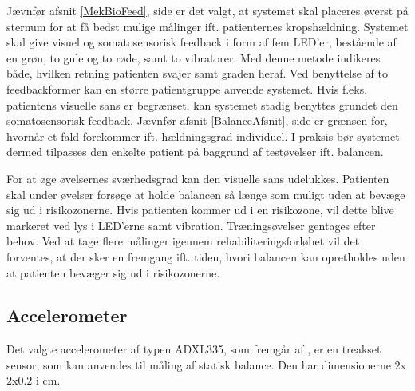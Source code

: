 Jævnfør afsnit \ref{MekBioFeed}, side \pageref{MekBioFeed} er det valgt, at systemet skal placeres øverst på sternum for at få bedst mulige målinger ift. patienternes kropshældning. Systemet skal give visuel og somatosensorisk feedback i form af fem LED'er, bestående af en grøn, to gule og to røde, samt to vibratorer. Med denne metode indikeres både, hvilken retning patienten svajer samt graden heraf. Ved benyttelse af to feedbackformer kan en større patientgruppe anvende systemet. Hvis f.eks. patientens visuelle sans er begrænset, kan systemet stadig benyttes grundet den somatosensorisk feedback. Jævnfør afsnit \ref{BalanceAfsnit}, side \pageref{BalanceAfsnit} er grænsen for, hvornår et fald forekommer ift. hældningsgrad individuel. I praksis bør systemet dermed tilpasses den enkelte patient på baggrund af testøvelser ift. balancen. %


For at øge øvelsernes sværhedsgrad kan den visuelle sans udelukkes. Patienten skal under øvelser forsøge at holde balancen så længe som muligt uden at bevæge sig ud i risikozonerne. Hvis patienten kommer ud i en risikozone, vil dette blive markeret ved lys i LED'erne samt vibration. Træningsøvelser gentages efter behov. Ved at tage flere målinger igennem rehabiliteringsforløbet vil det forventes, at der sker en fremgang ift. tiden, hvori balancen kan opretholdes uden at patienten bevæger sig ud i risikozonerne. 

\subsection{Accelerometer}\label{Subsec:AccTeori}
Det valgte accelerometer af typen ADXL335, som fremgår af , er en treakset sensor, som kan anvendes til måling af statisk balance. Den har dimensionerne $2$x$2$x$0.2$ i cm.  

